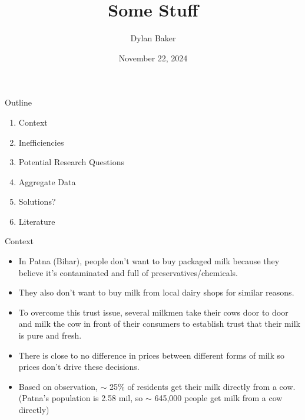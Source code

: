 \documentclass[12pt, aspectratio=169]{beamer}
\begin{document}
\title{Some Stuff}
\author{Dylan Baker}
\date{November 22, 2024}

\begin{frame} 
\maketitle
\end{frame}

\begin{frame}{Outline}
    \begin{enumerate}
        \item Context
        \item Inefficiencies
        \item Potential Research Questions
        \item Aggregate Data 
        \item Solutions?
        \item Literature
    \end{enumerate}
\end{frame}

\begin{frame}{Context}
\begin{itemize}
\item In Patna (Bihar), people don’t want to buy packaged milk because they believe it’s contaminated and full of preservatives/chemicals.  

\item They also don’t want to buy milk from local dairy shops for similar reasons.

\item To overcome this trust issue, several milkmen take their cows door to door and milk the cow in front of their consumers to establish trust that their milk is pure and fresh. 

\item There is close to no difference in prices between different forms of milk so prices don't drive these decisions. 

\item Based on observation, $\sim$ 25\% of residents get their milk directly from a cow. \small (Patna's population is 2.58 mil, so $\sim$ 645,000 people get milk from a cow directly)

\end{itemize}
\end{frame}
\end{document}
